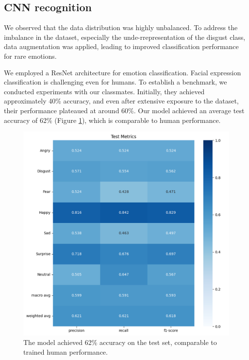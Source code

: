 \subsection{CNN recognition}
We observed that the data distribution was highly unbalanced. To address the imbalance in the dataset, especially the unde-rrepresentation of the disgust class, data augmentation was applied, leading to improved classification performance for rare emotions.

We employed a ResNet architecture for emotion classification. Facial expression classification is challenging even for humans. To establish a benchmark, we conducted experiments with our classmates. Initially, they achieved approximately 40\% accuracy, and even after extensive exposure to the dataset, their performance plateaued at around 60\%. Our model achieved an average test accuracy of 62\% (Figure \ref{fig:test_acc}), which is comparable to human performance.

\begin{figure}[!htb]
	\centering
	 \includegraphics[width=0.6\linewidth]{sec/assets/test_acc.png}
	 \caption{The model achieved 62\% accuracy on the test set, comparable to trained human performance.}
	 \label{fig:test_acc}
\end{figure}

